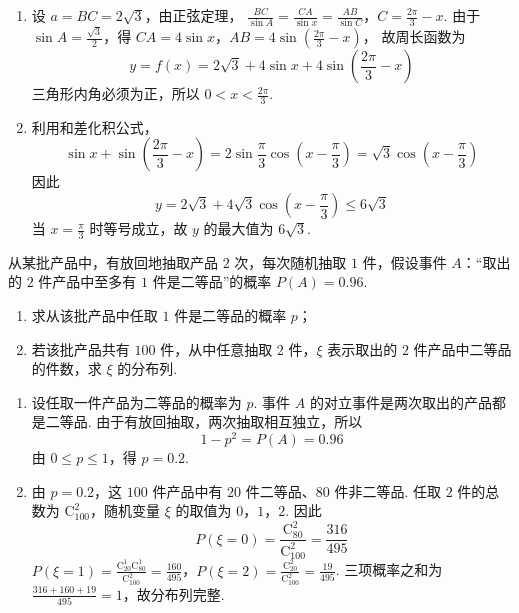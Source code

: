 \begin{solution}
\begin{enumerate}
\item 设 \(a=BC=2\sqrt3\)，由正弦定理，
\(\frac{BC}{\sin A}=\frac{CA}{\sin x}=\frac{AB}{\sin C}\)，\(C=\frac{2\pi}{3}-x\).
由于 \(\sin A=\frac{\sqrt3}{2}\)，得
\(CA=4\sin x\)，\(AB=4\sin\left(\frac{2\pi}{3}-x\right)\)，
故周长函数为
\[
y=f(x)=2\sqrt3+4\sin x+4\sin\left(\frac{2\pi}{3}-x\right)
\]
三角形内角必须为正，所以 \(0<x<\frac{2\pi}{3}\).

\item 利用和差化积公式，
\[
\sin x+\sin\left(\frac{2\pi}{3}-x\right)=2\sin\frac{\pi}{3}\cos\left(x-\frac{\pi}{3}\right)=\sqrt3\cos\left(x-\frac{\pi}{3}\right)
\]
因此
\[
y=2\sqrt3+4\sqrt3\cos\left(x-\frac{\pi}{3}\right)\leqslant6\sqrt3
\]
当 \(x=\frac\pi3\) 时等号成立，故 \(y\) 的最大值为 \(6\sqrt3\).
\end{enumerate}
\end{solution}

\begin{problem}
从某批产品中，有放回地抽取产品 \(2\) 次，每次随机抽取 \(1\) 件，假设事件 \(A\)：“取出的 \(2\) 件产品中至多有 \(1\) 件是二等品”的概率 \(P(A)=0.96\).
\begin{enumerate}
\item 求从该批产品中任取 \(1\) 件是二等品的概率 \(p\)；
\item 若该批产品共有 \(100\) 件，从中任意抽取 \(2\) 件，\(\xi\) 表示取出的 \(2\) 件产品中二等品的件数，求 \(\xi\) 的分布列.
\end{enumerate}
\end{problem}

\begin{solution}
\begin{enumerate}
\item 设任取一件产品为二等品的概率为 \(p\). 事件 \(A\) 的对立事件是两次取出的产品都是二等品. 由于有放回抽取，两次抽取相互独立，所以
\[
1-p^2=P(A)=0.96
\]
由 \(0\leqslant p\leqslant1\)，得 \(p=0.2\).

\item 由 \(p=0.2\)，这 \(100\) 件产品中有 \(20\) 件二等品、\(80\) 件非二等品. 任取 \(2\) 件的总数为 \(\mathrm C_{100}^{2}\)，随机变量 \(\xi\) 的取值为 \(0\)，\(1\)，\(2\). 因此
\[
P(\xi=0)=\frac{\mathrm C_{80}^{2}}{\mathrm C_{100}^{2}}=\frac{316}{495}
\]
\(P(\xi=1)=\frac{\mathrm C_{20}^{1}\mathrm C_{80}^{1}}{\mathrm C_{100}^{2}}=\frac{160}{495}\)，\(P(\xi=2)=\frac{\mathrm C_{20}^{2}}{\mathrm C_{100}^{2}}=\frac{19}{495}\).
三项概率之和为 \(\frac{316+160+19}{495}=1\)，故分布列完整.
\end{enumerate}
\end{solution}

